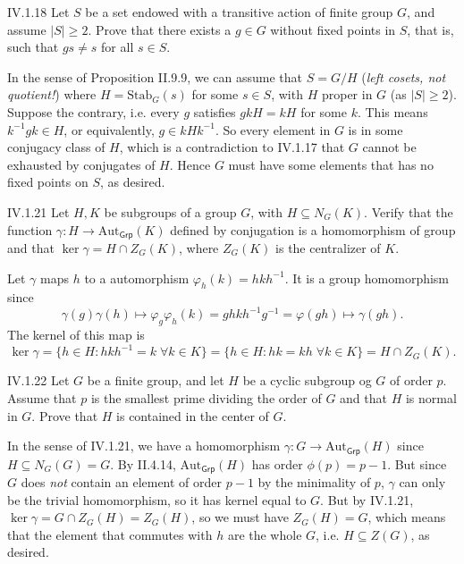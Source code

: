 \begin{problem}{IV.1.18}
Let $S$ be a set endowed with a transitive action of finite group $G$, and assume $|S| \geq 2$. Prove that there exists a $g \in G$ without fixed points in $S$, that is, such that $gs \neq s$ for all $s \in S$.
\end{problem}
\begin{pf}
In the sense of Proposition II.9.9, we can assume that $S = G/H$ (\emph{left cosets, not quotient!}) where $H = \text{Stab}_G(s)$ for some $s \in S$, with $H$ proper in $G$ (as $|S| \geq 2$). Suppose the contrary, i.e. every $g$ satisfies $gkH = kH$ for some $k$. This means $k^{-1}gk \in H$, or equivalently, $g \in kHk^{-1}$. So every element in $G$ is in some conjugacy class of $H$, which is a contradiction to IV.1.17 that $G$ cannot be exhausted by conjugates of $H$. Hence $G$ must have some elements that has no fixed points on $S$, as desired.
\end{pf}


\begin{problem}{IV.1.21}
Let $H,K$ be subgroups of a group $G$, with $H \subseteq N_G(K)$. Verify that the function $\gamma: H \to \text{Aut}_\mathsf{Grp}(K)$ defined by conjugation is a homomorphism of group and that $\ker \gamma = H \cap Z_G(K)$, where $Z_G(K)$ is the centralizer of $K$.	
\end{problem}
\begin{pf}
Let $\gamma$ maps $h$ to a automorphism $\varphi_h(k) = hkh^{-1}$. It is a group homomorphism since
\[
\gamma(g)\gamma(h) \mapsto \varphi_g \varphi_h(k) = ghkh^{-1}g^{-1} = \varphi(gh) \mapsto \gamma(gh).
\]
The kernel of this map is 
\[
\ker \gamma = \{h \in H: hkh^{-1} = k \; \forall k \in K\} = \{h \in H: hk = kh \; \forall k \in K\} = H \cap Z_G(K).	
\]
\end{pf}

\begin{problem}{IV.1.22}
Let $G$ be a finite group, and let $H$ be a cyclic subgroup og $G$ of order $p$. Assume that $p$ is the smallest prime dividing the order of $G$ and that $H$ is normal in $G$. Prove that $H$ is contained in the center of $G$.
\end{problem}
\begin{pf}
In the sense of IV.1.21, we have a homomorphism $\gamma:G \to \text{Aut}_\mathsf{Grp}(H)$ since $H \subseteq N_G(G) = G$. By II.4.14, $\text{Aut}_\mathsf{Grp}(H)$ has order $\phi(p)=p-1$. But since $G$ does \emph{not} contain an element of order $p-1$ by the minimality of $p$, $\gamma$ can only be the trivial homomorphism, so it has kernel equal to $G$. But by IV.1.21, $\ker \gamma = G \cap Z_G(H) = Z_G(H)$, so we must have $Z_G(H) = G$, which means that the element that commutes with $h$ are the whole $G$, i.e. $H \subseteq Z(G)$, as desired. 
\end{pf}

